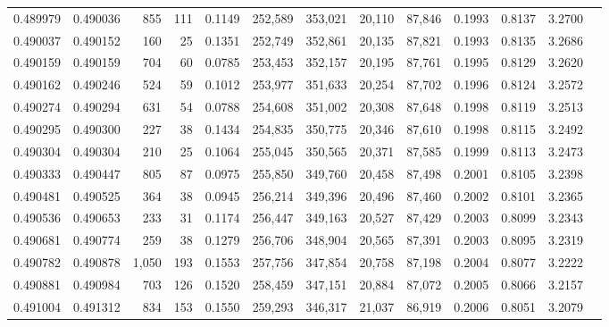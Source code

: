 \begin{tabular}{rrrrrrrrrrrrr}
0.489979 & 0.490036 &   855 &   111 &                                     0.1149 & 252,589 & 353,021 &  20,110 &  87,846 & 0.1993 & 0.8137 & 3.2700 \\
0.490037 & 0.490152 &   160 &    25 &                                     0.1351 & 252,749 & 352,861 &  20,135 &  87,821 & 0.1993 & 0.8135 & 3.2686 \\
0.490159 & 0.490159 &   704 &    60 &                                     0.0785 & 253,453 & 352,157 &  20,195 &  87,761 & 0.1995 & 0.8129 & 3.2620 \\
0.490162 & 0.490246 &   524 &    59 &                                     0.1012 & 253,977 & 351,633 &  20,254 &  87,702 & 0.1996 & 0.8124 & 3.2572 \\
0.490274 & 0.490294 &   631 &    54 &                                     0.0788 & 254,608 & 351,002 &  20,308 &  87,648 & 0.1998 & 0.8119 & 3.2513 \\
0.490295 & 0.490300 &   227 &    38 &                                     0.1434 & 254,835 & 350,775 &  20,346 &  87,610 & 0.1998 & 0.8115 & 3.2492 \\
0.490304 & 0.490304 &   210 &    25 &                                     0.1064 & 255,045 & 350,565 &  20,371 &  87,585 & 0.1999 & 0.8113 & 3.2473 \\
0.490333 & 0.490447 &   805 &    87 &                                     0.0975 & 255,850 & 349,760 &  20,458 &  87,498 & 0.2001 & 0.8105 & 3.2398 \\
0.490481 & 0.490525 &   364 &    38 &                                     0.0945 & 256,214 & 349,396 &  20,496 &  87,460 & 0.2002 & 0.8101 & 3.2365 \\
0.490536 & 0.490653 &   233 &    31 &                                     0.1174 & 256,447 & 349,163 &  20,527 &  87,429 & 0.2003 & 0.8099 & 3.2343 \\
0.490681 & 0.490774 &   259 &    38 &                                     0.1279 & 256,706 & 348,904 &  20,565 &  87,391 & 0.2003 & 0.8095 & 3.2319 \\
0.490782 & 0.490878 & 1,050 &   193 &                                     0.1553 & 257,756 & 347,854 &  20,758 &  87,198 & 0.2004 & 0.8077 & 3.2222 \\
0.490881 & 0.490984 &   703 &   126 &                                     0.1520 & 258,459 & 347,151 &  20,884 &  87,072 & 0.2005 & 0.8066 & 3.2157 \\
0.491004 & 0.491312 &   834 &   153 &                                     0.1550 & 259,293 & 346,317 &  21,037 &  86,919 & 0.2006 & 0.8051 & 3.2079 \\

\end{tabular}
